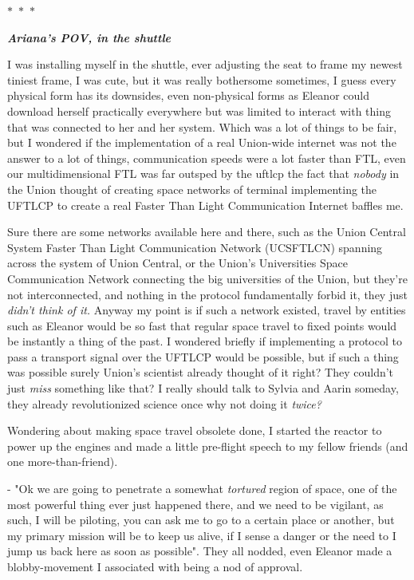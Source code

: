 \documentclass[colorlinks,12pt,a4paper]{book}
\newcommand\sep{\begin{center}
  \boldmath $\ast$~$\ast$~$\ast$
\end{center}}
\begin{document}
 \sep 
 \textit{\textbf{Ariana's POV, in the shuttle}}\par 
 \bigskip 
 I was installing myself in the shuttle, ever adjusting the seat to frame my newest tiniest frame, I was cute, but it was 
 really bothersome sometimes, I guess every physical form has its downsides, even non-physical forms as Eleanor could download 
 herself practically everywhere but was limited to interact with thing that was connected to her and her system. Which was a lot 
 of things to be fair, but I wondered if the implementation of a real Union-wide internet was not the answer to a lot of things, 
 communication speeds were a lot faster than FTL, even our multidimensional FTL was far outsped by the \gls{uftlcp}
 the fact that \textit{nobody} in the Union thought of creating space networks of terminal implementing the UFTLCP to create 
 a real Faster Than Light Communication Internet baffles me.\par 
 \bigskip
 
 Sure there are some networks available here and there, such as the 
 Union Central System Faster Than Light Communication Network (UCSFTLCN) spanning across the system of Union Central, 
 or the Union's Universities Space Communication Network connecting the big universities of the Union, but they're not 
 interconnected, and nothing in the protocol fundamentally forbid it, they just \textit{didn't think of it.}
 Anyway my point is if such a network existed, travel by entities such as Eleanor would be so fast that regular space travel 
 to fixed points would be instantly a thing of the past. I wondered briefly if implementing a protocol to pass a transport 
 signal over the UFTLCP would be possible, but if such a thing was possible surely Union's scientist already thought of it right?
 They couldn't just \textit{miss} something like that? I really should talk to Sylvia and Aarin someday, they already revolutionized 
 science once why not doing it \textit{twice?}\par 
 \bigskip
 
 Wondering about making space travel obsolete done, I started the reactor to power up the engines and made a little pre-flight 
 speech to my fellow friends (and one more-than-friend).\par 
 \bigskip 
 
 - "Ok we are going to penetrate a somewhat \textit{tortured} region of space, one of the most powerful thing ever just happened 
 there, and we need to be vigilant, as such, I will be piloting, you can ask me to go to a certain place or another, but my primary 
 mission will be to keep us alive, if I sense a danger or the need to I jump us back here as soon as possible". They all nodded, even 
 Eleanor made a blobby-movement I associated with being a nod of approval.\par 
 \bigskip
 
\end{document}
